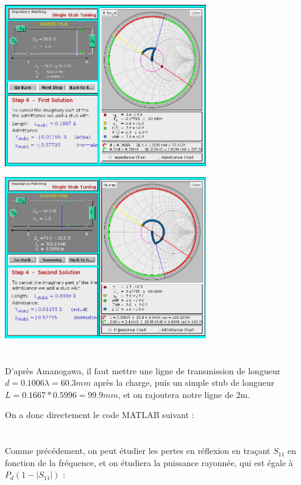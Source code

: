 \documentclass[11pt;a4paper;fleqn]{report}
\begin{document}
   \begin{center}
    \includegraphics[height=7cm]{images/s1}

    \includegraphics[height=7cm]{images/s2}
   \end{center}
  \section{}

   D'après Amanogawa, il faut mettre une ligne de transmission de longueur $d=0.1006 \lambda = 60.3mm$ après la charge, puis un simple stub de longueur $L=0.1667*0.5996=99.9mm$, et on rajoutera notre ligne de 2m.

   On a donc directement le code MATLAB suivant :

   

  \section{}
   Comme précédement, on peut étudier les pertes en réflexion en traçant $S_{11}$ en fonction de la fréquence, et on étudiera la puissance rayonnée, qui est égale à $P_d(1-|S_{11}|)$ :

   
\end{document}
